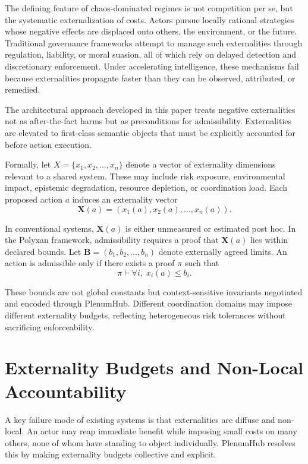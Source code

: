\documentclass[11pt,oneside]{article}
\begin{document}
The defining feature of chaos-dominated regimes is not competition per se, but the systematic externalization of costs. Actors pursue locally rational strategies whose negative effects are displaced onto others, the environment, or the future. Traditional governance frameworks attempt to manage such externalities through regulation, liability, or moral suasion, all of which rely on delayed detection and discretionary enforcement. Under accelerating intelligence, these mechanisms fail because externalities propagate faster than they can be observed, attributed, or remedied.

The architectural approach developed in this paper treats negative externalities not as after-the-fact harms but as preconditions for admissibility. Externalities are elevated to first-class semantic objects that must be explicitly accounted for before action execution.

Formally, let \( X = \{x_1, x_2, \ldots, x_n\} \) denote a vector of externality dimensions relevant to a shared system. These may include risk exposure, environmental impact, epistemic degradation, resource depletion, or coordination load. Each proposed action \( a \) induces an externality vector
\[
\mathbf{X}(a) = (x_1(a), x_2(a), \ldots, x_n(a)).
\]

In conventional systems, \( \mathbf{X}(a) \) is either unmeasured or estimated post hoc. In the Polyxan framework, admissibility requires a proof that \( \mathbf{X}(a) \) lies within declared bounds. Let \( \mathbf{B} = (b_1, b_2, \ldots, b_n) \) denote externally agreed limits. An action is admissible only if there exists a proof \( \pi \) such that
\[
\pi \vdash \forall i,\; x_i(a) \leq b_i.
\]

These bounds are not global constants but context-sensitive invariants negotiated and encoded through PlenumHub. Different coordination domains may impose different externality budgets, reflecting heterogeneous risk tolerances without sacrificing enforceability.

\section{Externality Budgets and Non-Local Accountability}

A key failure mode of existing systems is that externalities are diffuse and non-local. An actor may reap immediate benefit while imposing small costs on many others, none of whom have standing to object individually. PlenumHub resolves this by making externality budgets collective and explicit.
\end{document}
